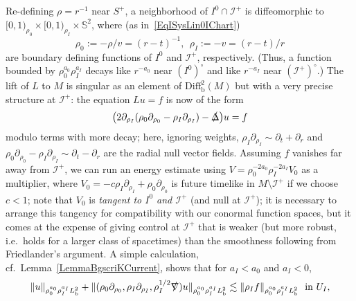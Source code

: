 \documentclass[reqno,11pt,letterpaper]{amsart}
\numberwithin{equation}{section}
\numberwithin{figure}{section}
\theoremstyle{definition}
\theoremstyle{remark}
\newcommand{\ms}{\mathscr}
\newcommand{\scri}{\ms I}
\newcommand{\Sph}{\mathbb{S}}
\newcommand{\slDelta}{\slashed{\Delta}{}}
\newcommand{\slnabla}{\slashed{\nabla}{}}
\newcommand{\pa}{\partial}
\newcommand{\tn}{\textnormal}
\newcommand{\bop}{{\mathrm{b}}}
\newcommand{\Diff}{\mathrm{Diff}}
\newcommand{\Diffb}{\Diff_\bop}
\begin{document}
Re-defining $\rho=r^{-1}$ near $S^+$, a neighborhood of $I^0\cap\scri^+$ is diffeomorphic to $[0,1)_{\rho_0}\times[0,1)_{\rho_I}\times\Sph^2$, where (as in~\eqref{EqISysLin0IChart})
\begin{equation}
\label{EqISysLinCoords0I}
  \rho_0 := -\rho/v = (r-t)^{-1},\ \ \rho_I := -v = (r-t)/r
\end{equation}
are boundary defining functions of $I^0$ and $\scri^+$, respectively. (Thus, a function bounded by $\rho_0^{a_0}\rho_I^{a_I}$ decays like $r^{-a_0}$ near $(I^0)^\circ$ and like $r^{-a_I}$ near $(\scri^+)^\circ$.) The lift of $L$ to $M$ is singular as an element of $\Diffb^2(M)$ but with a very precise structure at $\scri^+$: the equation $L u=f$ is now of the form
\begin{equation}
\label{EqISysLinEqI}
  \bigl(2\pa_{\rho_I}(\rho_0\pa_{\rho_0}-\rho_I\pa_{\rho_I}) - \slDelta\bigr)u = f
\end{equation}
modulo terms with more decay; here, ignoring weights, $\rho_I\pa_{\rho_I}\sim\pa_t+\pa_r$ and $\rho_0\pa_{\rho_0}-\rho_I\pa_{\rho_I}\sim\pa_t-\pa_r$ are the radial null vector fields. Assuming $f$ vanishes far away from $\scri^+$, we can run an energy estimate using $V=\rho_0^{-2 a_0}\rho_I^{-2 a_I}V_0$ as a multiplier, where $V_0=-c\rho_I\pa_{\rho_I}+\rho_0\pa_{\rho_0}$ is future timelike in $M\setminus\scri^+$ if we choose $c<1$; note that $V_0$ is \emph{tangent to $I^0$ and $\scri^+$} (and null at $\scri^+$); it is necessary to arrange this tangency for compatibility with our conormal function spaces, but it comes at the expense of giving control at $\scri^+$ that is weaker (but more robust, i.e.\ holds for a larger class of spacetimes) than the smoothness following from Friedlander's argument. A simple calculation, cf.\ Lemma~\ref{LemmaBgscriKCurrent}, shows that for $a_I<a_0$ and $a_I<0$,
\begin{equation}
\label{EqISysLinEqIEst}
  \|u\|_{\rho_0^{a_0}\rho_I^{a_I}L^2_\bop} + \|(\rho_0\pa_{\rho_0},\rho_I\pa_{\rho_I},\rho_I^{1/2}\slnabla)u\|_{\rho_0^{a_0}\rho_I^{a_I}L^2_\bop} \lesssim \|\rho_I f\|_{\rho_0^{a_0}\rho_I^{a_I}L^2_\bop}\ \ \tn{in}\ U_I,
\end{equation}
\end{document}
